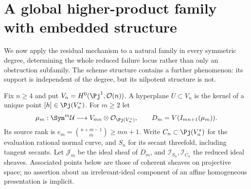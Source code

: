 \section{A global higher-product family with embedded structure}
\label{sec:higher-hyperplane-classification}
We now apply the residual mechanism to a natural family in every
symmetric degree, determining the whole reduced failure locus rather
than only an obstruction subfamily. The scheme structure contains a
further phenomenon: its support is independent of the degree, but
its nilpotent structure is not.

Fix $n\ge4$ and put $V_n=H^0(\Pj^1,\mathcal O(n))$. A hyperplane
$U\subset V_n$ is the kernel of a unique point $[h]\in\Pj(V_n^*)$.
For $m\ge2$ let
\[
 \mu_m:\Sym^m\mathcal U\longrightarrow
          V_{mn}\otimes\mathcal O_{\Pj(V_n^*)},\qquad
 D_m=V(I_{mn+1}(\mu_m)).
\]
Its source rank is $e_m=\binom{n+m-1}{m}\ge mn+1$.
Write $C_n\subset\Pj(V_n^*)$ for the evaluation rational normal
curve, and $S_n$ for its secant threefold, including tangent secants.
Let $\mathcal J_m$ be the ideal sheaf of $D_m$, and
$\mathcal I_{S_n},\mathcal I_{C_n}$ the reduced ideal sheaves.
Associated points below are those of coherent sheaves on projective
space; no assertion about an irrelevant-ideal component of an affine
homogeneous presentation is implicit.

